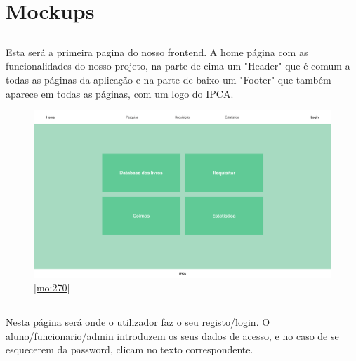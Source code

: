 \section{Mockups}



\subsection{}

Esta será a primeira pagina do nosso frontend. A home página com as funcionalidades do nosso projeto, na parte de cima um "Header" que é comum a todas as páginas da aplicação e na parte de baixo um "Footer" que também aparece em todas as páginas, com um logo do IPCA.

\begin{figure}[H]
	\centering
	\includegraphics[width=1\linewidth]{../Mockups/PNGs/Home.png}  %
	\caption{\ref{mo:270}}
	\label{fig:chap270}
\end{figure}


\newpage 

\subsection{}

Nesta página será onde o utilizador faz o seu registo/login. O aluno/funcionario/admin introduzem os seus dados de acesso, e no caso de se esquecerem da password, clicam no texto correspondente.

